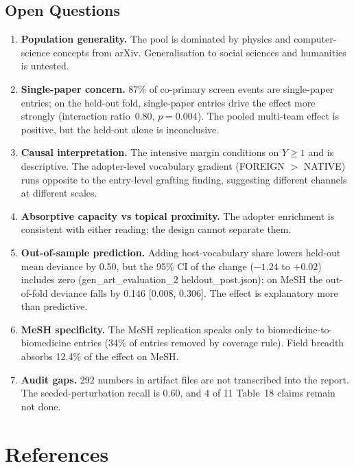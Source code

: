 \documentclass[11pt,letterpaper]{article}
\begin{document}
\subsection{Open Questions}

\begin{enumerate}
\item \textbf{Population generality.} The pool is dominated by physics and computer-science concepts from arXiv. Generalisation to social sciences and humanities is untested.
\item \textbf{Single-paper concern.} 87\% of co-primary screen events are single-paper entries; on the held-out fold, single-paper entries drive the effect more strongly (interaction ratio~0.80, $p = 0.004$). The pooled multi-team effect is positive, but the held-out alone is inconclusive.
\item \textbf{Causal interpretation.} The intensive margin conditions on $Y \geq 1$ and is descriptive. The adopter-level vocabulary gradient (FOREIGN $>$ NATIVE) runs opposite to the entry-level grafting finding, suggesting different channels at different scales.
\item \textbf{Absorptive capacity vs topical proximity.} The adopter enrichment is consistent with either reading; the design cannot separate them.
\item \textbf{Out-of-sample prediction.} Adding host-vocabulary share lowers held-out mean deviance by 0.50, but the 95\% CI of the change ($-1.24$ to $+0.02$) includes zero (gen\_art\_evaluation\_2 heldout\_post.json); on MeSH the out-of-fold deviance falls by 0.146 [0.008, 0.306]. The effect is explanatory more than predictive.
\item \textbf{MeSH specificity.} The MeSH replication speaks only to biomedicine-to-biomedicine entries (34\% of entries removed by coverage rule). Field breadth absorbs 12.4\% of the effect on MeSH.
\item \textbf{Audit gaps.} 292 numbers in artifact files are not transcribed into the report. The seeded-perturbation recall is 0.60, and 4 of 11 Table~18 claims remain not done.
\end{enumerate}


\section*{References}
\end{document}
